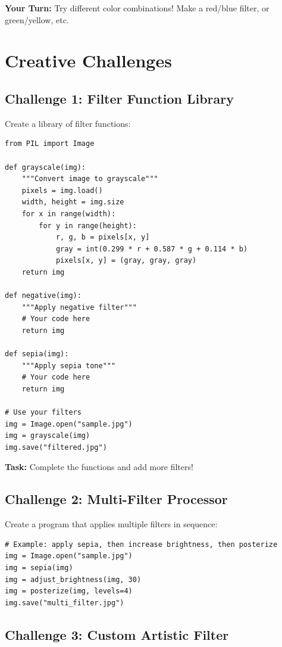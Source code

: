 \documentclass[11pt]{article}
\begin{document}
\textbf{Your Turn:} Try different color combinations! Make a red/blue filter, or green/yellow, etc.

\section{Creative Challenges}

\subsection*{Challenge 1: Filter Function Library}

Create a library of filter functions:

\begin{lstlisting}
from PIL import Image

def grayscale(img):
    """Convert image to grayscale"""
    pixels = img.load()
    width, height = img.size
    for x in range(width):
        for y in range(height):
            r, g, b = pixels[x, y]
            gray = int(0.299 * r + 0.587 * g + 0.114 * b)
            pixels[x, y] = (gray, gray, gray)
    return img

def negative(img):
    """Apply negative filter"""
    # Your code here
    return img

def sepia(img):
    """Apply sepia tone"""
    # Your code here
    return img

# Use your filters
img = Image.open("sample.jpg")
img = grayscale(img)
img.save("filtered.jpg")
\end{lstlisting}

\textbf{Task:} Complete the functions and add more filters!

\subsection*{Challenge 2: Multi-Filter Processor}

Create a program that applies multiple filters in sequence:

\begin{lstlisting}
# Example: apply sepia, then increase brightness, then posterize
img = Image.open("sample.jpg")
img = sepia(img)
img = adjust_brightness(img, 30)
img = posterize(img, levels=4)
img.save("multi_filter.jpg")
\end{lstlisting}

\subsection*{Challenge 3: Custom Artistic Filter}
\end{document}
